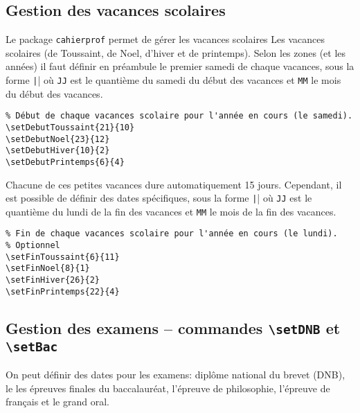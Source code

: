 \documentclass[a4paper,french,10pt]{article}
\begin{document}
\subsection{Gestion des vacances scolaires}

Le package \texttt{cahierprof} permet de gérer les vacances scolaires
Les vacances scolaires (de Toussaint, de Noel, d'hiver et de printemps). Selon
les zones (et les années) il faut définir en préambule le premier samedi de
chaque vacances, sous la forme \texttt||
où \texttt{JJ} est le quantième du samedi du début des vacances et \texttt{MM}
le mois du début des vacances. 
\begin{verbatim}
% Début de chaque vacances scolaire pour l'année en cours (le samedi).
\setDebutToussaint{21}{10}
\setDebutNoel{23}{12}
\setDebutHiver{10}{2}
\setDebutPrintemps{6}{4}
\end{verbatim}
Chacune de ces petites vacances dure automatiquement 15 jours. Cependant, il est
possible de définir des dates spécifiques, sous la forme
\texttt|| où \texttt{JJ} est le quantième du
lundi de la fin des vacances et \texttt{MM} le mois de la fin des vacances.
\begin{verbatim}
% Fin de chaque vacances scolaire pour l'année en cours (le lundi).
% Optionnel
\setFinToussaint{6}{11}
\setFinNoel{8}{1}
\setFinHiver{26}{2}
\setFinPrintemps{22}{4}
\end{verbatim}

\subsection{Gestion des examens -- commandes \texttt{\textbackslash{}setDNB} et
  \texttt{\textbackslash{}setBac}
}

On peut définir des dates pour les examens: diplôme national du brevet (DNB), le
les épreuves finales du baccalauréat, l'épreuve de philosophie, l'épreuve de
français et le grand oral. 
\end{document}
